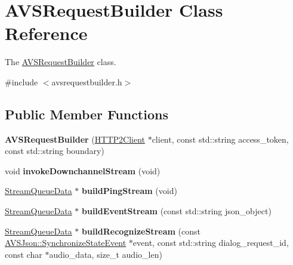 \hypertarget{classAVSRequestBuilder}{}\section{A\+V\+S\+Request\+Builder Class Reference}
\label{classAVSRequestBuilder}


The \hyperlink{classAVSRequestBuilder}{A\+V\+S\+Request\+Builder} class.  




{\ttfamily \#include $<$avsrequestbuilder.\+h$>$}

\subsection*{Public Member Functions}
\begin{DoxyCompactItemize}
\item 
\mbox{\label{classAVSRequestBuilder_aad07747e25a7ca802ca2033a808f691a}} 
{\bfseries A\+V\+S\+Request\+Builder} (\hyperlink{classNetwork_1_1HTTP2_1_1HTTP2Client}{H\+T\+T\+P2\+Client} $\ast$client, const std\+::string access\+\_\+token, const std\+::string boundary)
\item 
\mbox{\label{classAVSRequestBuilder_ae3e41597c71041e80ed80a3e9988bf4d}} 
void {\bfseries invoke\+Downchannel\+Stream} (void)
\item 
\mbox{\label{classAVSRequestBuilder_a7ae94bd81412f37e0c4a4f57c12ead88}} 
\hyperlink{structNetwork_1_1HTTP2_1_1StreamQueueData}{Stream\+Queue\+Data} $\ast$ {\bfseries build\+Ping\+Stream} (void)
\item 
\mbox{\label{classAVSRequestBuilder_a05c5f0f8615e1279b47dce8c06bdc617}} 
\hyperlink{structNetwork_1_1HTTP2_1_1StreamQueueData}{Stream\+Queue\+Data} $\ast$ {\bfseries build\+Event\+Stream} (const std\+::string json\+\_\+object)
\item 
\mbox{\label{classAVSRequestBuilder_a1b996a3a7414d561f6168289f89464e5}} 
\hyperlink{structNetwork_1_1HTTP2_1_1StreamQueueData}{Stream\+Queue\+Data} $\ast$ {\bfseries build\+Recognize\+Stream} (const \hyperlink{structAVSJson_1_1SynchronizeStateEvent}{A\+V\+S\+Json\+::\+Synchronize\+State\+Event} $\ast$event, const std\+::string dialog\+\_\+request\+\_\+id, const char $\ast$audio\+\_\+data, size\+\_\+t audio\+\_\+len)

\end{DoxyCompactItemize}
